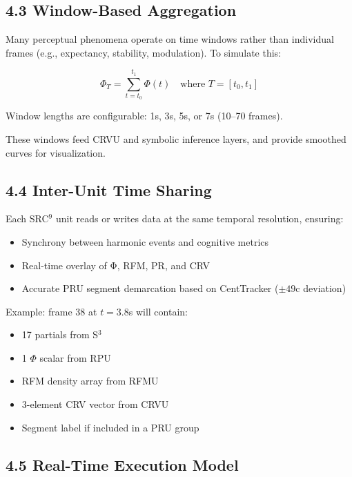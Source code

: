 \documentclass[10pt]{article}
\begin{document}
\subsection*{4.3 Window-Based Aggregation}

Many perceptual phenomena operate on time windows rather than individual frames (e.g., expectancy, stability, modulation). To simulate this:

\begin{equation}
\Phi_T = \sum_{t=t_0}^{t_1} \Phi(t)
\quad \text{where } T = [t_0, t_1]
\end{equation}

Window lengths are configurable: 1s, 3s, 5s, or 7s (10–70 frames). 

These windows feed CRVU and symbolic inference layers, and provide smoothed curves for visualization.

\subsection*{4.4 Inter-Unit Time Sharing}

Each SRC$^9$ unit reads or writes data at the same temporal resolution, ensuring:

\begin{itemize}
    \item Synchrony between harmonic events and cognitive metrics
    \item Real-time overlay of Φ, RFM, PR, and CRV
    \item Accurate PRU segment demarcation based on CentTracker ($\pm49$c deviation)
\end{itemize}

Example: frame 38 at $t=3.8$s will contain:

\begin{itemize}
    \item 17 partials from S$^3$
    \item 1 $\Phi$ scalar from RPU
    \item RFM density array from RFMU
    \item 3-element CRV vector from CRVU
    \item Segment label if included in a PRU group
\end{itemize}

\subsection*{4.5 Real-Time Execution Model}
\end{document}

